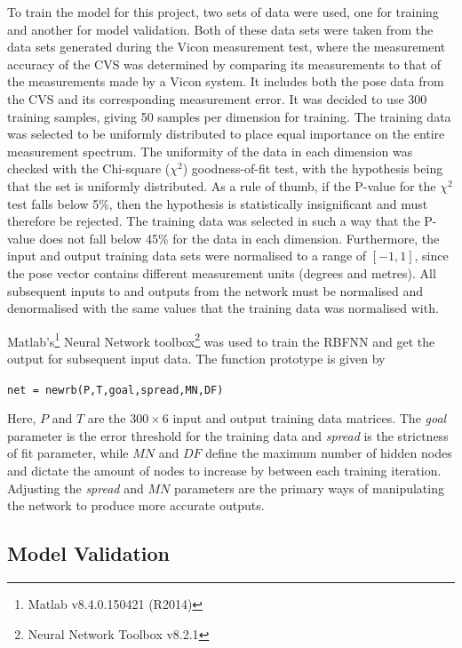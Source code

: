 To train the model for this project, two sets of data were used, one for training and another for model validation. Both of these data sets were taken from the data sets generated during the Vicon measurement test, where the measurement accuracy of the CVS was determined by comparing its measurements to that of the measurements made by a Vicon system. It includes both the pose data from the CVS and its corresponding measurement error. It was decided to use 300 training samples, giving 50 samples per dimension for training. The training data was selected to be uniformly distributed to place equal importance on the entire measurement spectrum. The uniformity of the data in each dimension was checked with the Chi-square ($\chi^2$) goodness-of-fit test, with the hypothesis being that the set is uniformly distributed. As a rule of thumb, if the P-value for the $\chi^2$ test falls below 5\%, then the hypothesis is statistically insignificant and must therefore be rejected. The training data was selected in such a way that the P-value does not fall below 45\% for the data in each dimension. Furthermore, the input and output training data sets were normalised to a range of $[-1, 1]$, since the pose vector contains different measurement units (degrees and metres). All subsequent inputs to and outputs from the network must be normalised and denormalised with the same values that the training data was normalised with.  

Matlab's\footnote{Matlab v8.4.0.150421 (R2014)} Neural Network toolbox\footnote{Neural Network Toolbox v8.2.1} was used to train the RBFNN and get the output for subsequent input data. The function prototype is given by 

\begin{center}
  \verb|net = newrb(P,T,goal,spread,MN,DF)|
\end{center}

Here, $P$ and $T$ are the $300\times6$ input and output training data matrices. The \emph{goal} parameter is the error threshold for the training data and \emph{spread} is the strictness of fit parameter, while $\mathit{MN}$ and $\mathit{DF}$ define the maximum number of hidden nodes and dictate the amount of nodes to increase by between each training iteration. Adjusting the \emph{spread} and $\mathit{MN}$ parameters are the primary ways of manipulating the network to produce more accurate outputs. 

\subsection{Model Validation}

